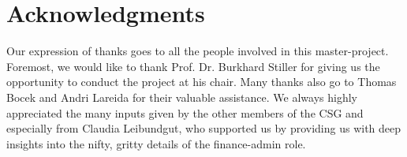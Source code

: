 \chapter*{Acknowledgments}

Our expression of thanks goes to all the people involved in this master-project. Foremost, we would like to thank Prof. Dr. Burkhard Stiller for giving us the opportunity to conduct the project at his chair. Many thanks also go to Thomas Bocek and Andri Lareida for their valuable assistance. We always highly appreciated the many inputs given by the other members of the CSG and especially from Claudia Leibundgut, who supported us by providing us with deep insights into the nifty, gritty details of the finance-admin role.
